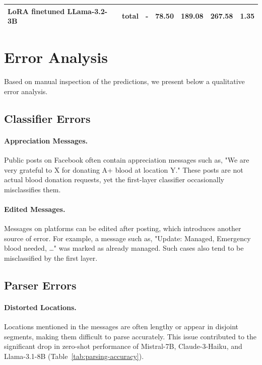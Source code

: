 \documentclass[11pt]{article}
\begin{document}
\begin{table}[h]
{\begin{tabular}{l l l l l l l}
\midrule
\multirow{1}{*}{LoRA finetuned LLama-3.2-3B} 
                                    & total                          & -           & \textbf{78.50}                  & \textbf{189.08 }                   & \textbf{267.58}                  & 1.35                       \\

\bottomrule
\end{tabular}
}
\end{table}













\section{Error Analysis}

Based on manual inspection of the predictions, we present below a qualitative error analysis.

\subsection{Classifier Errors}

\paragraph{Appreciation Messages.}  
Public posts on Facebook often contain appreciation messages such as, "We are very grateful to X for donating A+ blood at location Y." These posts are not actual blood donation requests, yet the first-layer classifier occasionally misclassifies them.

\paragraph{Edited Messages.}  
Messages on platforms can be edited after posting, which introduces another source of error. For example, a message such as, "Update: Managed, Emergency blood needed, \ldots" was marked as already managed. Such cases also tend to be misclassified by the first layer.

\subsection{Parser Errors}

\paragraph{Distorted Locations.}  
Locations mentioned in the messages are often lengthy or appear in disjoint segments, making them difficult to parse accurately. This issue contributed to the significant drop in zero-shot performance of Mistral-7B, Claude-3-Haiku, and Llama-3.1-8B (Table~\ref{tab:parsing-accuracy}).
\end{document}
